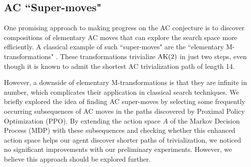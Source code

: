 \subsection{AC ``Super-moves"} One promising approach to making progress on the AC conjecture is to discover compositions of elementary AC moves that can explore the search space more efficiently. A classical example of such ``super-moves" are the ``elementary M-transformations" \cite{BurnsI, BurnsII}. These transformations trivialize $\text{AK}(2)$ in just two steps, even though it is known to admit the shortest AC trivialization path of length 14.
\newline

However, a downside of elementary M-transformations is that they are infinite in number, which complicates their application in classical search techniques. We briefly explored the idea of finding AC super-moves by selecting some frequently occurring subsequences of AC moves in the paths discovered by Proximal Policy Optimization (PPO). By extending the action space $A$ of the Markov Decision Process (MDP) with these subsequences and checking whether this enhanced action space helps our agent discover shorter paths of trivialization, we noticed no significant improvements with our preliminary experiments. However, we believe this approach should be explored further.
